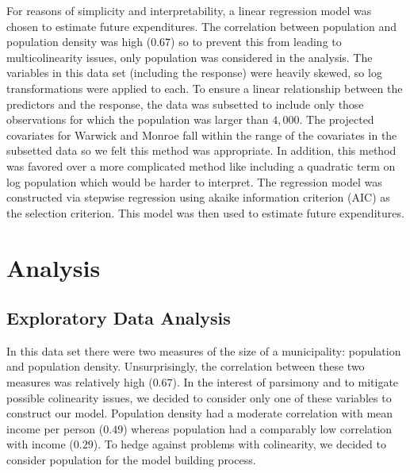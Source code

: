 \documentclass{article}\usepackage[]{graphicx}\usepackage[]{color}
\begin{document}
For reasons of simplicity and interpretability, a linear regression model was chosen to estimate future expenditures. The correlation between population and population density was high ($0.67$) so to prevent this from leading to multicolinearity issues, only population was considered in the analysis. The variables in this data set (including the response) were heavily skewed, so log transformations were applied to each. To ensure a linear relationship between the predictors and the response, the data was subsetted to include only those observations for which the population was larger than $4,000$. The projected covariates for Warwick and Monroe fall within the range of the covariates in the subsetted data so we felt this method was appropriate. In addition, this method was favored over a more complicated method like including a quadratic term on log population which would be harder to interpret. The regression model was constructed via stepwise regression using akaike information criterion (AIC) as the selection criterion. This model was then used to estimate future expenditures.



\section{Analysis} \label{analysis}




\subsection{Exploratory Data Analysis} \label{eda}

In this data set there were two measures of the size of a municipality: population and population density. Unsurprisingly, the correlation between these two measures was relatively high ($0.67$). In the interest of parsimony and to mitigate possible colinearity issues, we decided to consider only one of these variables to construct our model. Population density had a moderate correlation with mean income per person ($0.49$) whereas population had a comparably low correlation with income ($0.29$). To hedge against problems with colinearity, we decided to consider population for the model building process.
\end{document}
